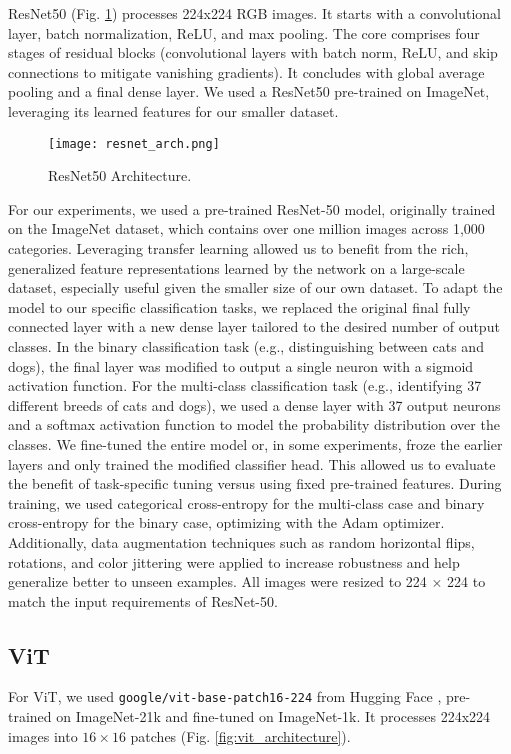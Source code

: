 \documentclass{article}
\begin{document}
ResNet50 \cite{resnet} (Fig. \ref{fig:resnet_architecture}) processes 224x224 RGB images. It starts with a convolutional layer, batch normalization, ReLU, and max pooling. The core comprises four stages of residual blocks (convolutional layers with batch norm, ReLU, and skip connections to mitigate vanishing gradients). It concludes with global average pooling and a final dense layer. We used a ResNet50 pre-trained on ImageNet, leveraging its learned features for our smaller dataset.

\begin{figure}[h]
    \centering
    \texttt{[image: resnet\_arch.png]}
    \caption{ResNet50 Architecture.}
    \label{fig:resnet_architecture}
\end{figure}

For our experiments, we used a pre-trained ResNet-50 model, originally trained on the ImageNet dataset, which contains over one million images across 1,000 categories. Leveraging transfer learning allowed us to benefit from the rich, generalized feature representations learned by the network on a large-scale dataset, especially useful given the smaller size of our own dataset. To adapt the model to our specific classification tasks, we replaced the original final fully connected layer with a new dense layer tailored to the desired number of output classes. In the binary classification task (e.g., distinguishing between cats and dogs), the final layer was modified to output a single neuron with a sigmoid activation function. For the multi-class classification task (e.g., identifying 37 different breeds of cats and dogs), we used a dense layer with 37 output neurons and a softmax activation function to model the probability distribution over the classes. We fine-tuned the entire model or, in some experiments, froze the earlier layers and only trained the modified classifier head. This allowed us to evaluate the benefit of task-specific tuning versus using fixed pre-trained features. During training, we used categorical cross-entropy for the multi-class case and binary cross-entropy for the binary case, optimizing with the Adam optimizer. Additionally, data augmentation techniques such as random horizontal flips, rotations, and color jittering were applied to increase robustness and help generalize better to unseen examples. All images were resized to 224 × 224 to match the input requirements of ResNet-50.

\subsection{ViT}
For ViT, we used \texttt{google/vit-base-patch16-224} from Hugging Face \citep{wolf-etal-2020-transformers}, pre-trained on ImageNet-21k and fine-tuned on ImageNet-1k. It processes 224x224 images into $16 \times 16$ patches (Fig. \ref{fig:vit_architecture}).
\end{document}
